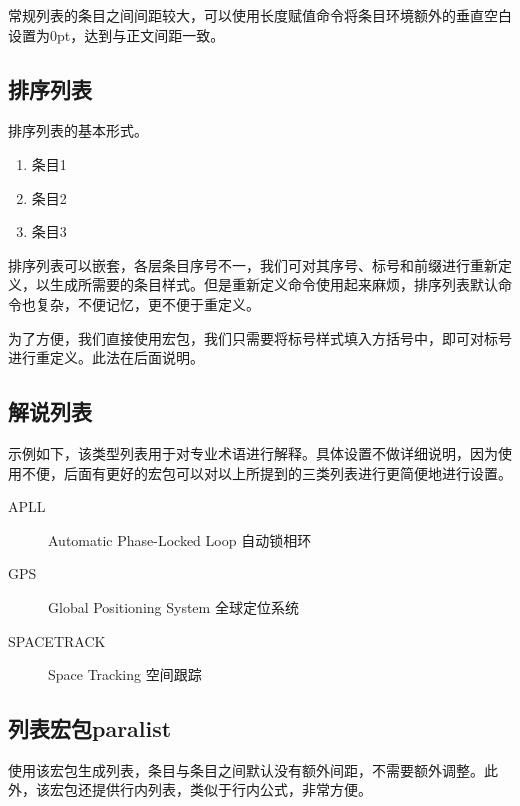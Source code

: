 常规列表的条目之间间距较大，可以使用长度赋值命令将条目环境额外的垂直空白设置为0pt，达到与正文间距一致。

\begin{latex}{}
\itemsep=0pt
\parskip=0pt
\end{latex}

\subsection{排序列表}
排序列表的基本形式。

\begin{codeshow}
	\begin{enumerate}
		\item 条目1
		\item 条目2
		\item 条目3
	\end{enumerate}
\end{codeshow}

排序列表可以嵌套，各层条目序号不一，我们可对其序号、标号和前缀进行重新定义，以生成所需要的条目样式。但是重新定义命令使用起来麻烦，排序列表默认命令也复杂，不便记忆，更不便于重定义。

为了方便，我们直接使用宏包，我们只需要将标号样式填入方括号中，即可对标号进行重定义。此法在后面说明。

\subsection{解说列表}
示例如下，该类型列表用于对专业术语进行解释。具体设置不做详细说明，因为使用不便，后面有更好的宏包可以对以上所提到的三类列表进行更简便地进行设置。

\begin{codeshow}
	\begin{description}
		\item[APLL] 
		Automatic Phase-Locked Loop 自动锁相环
		\item[GPS] Global 
		Positioning System 全球定位系统
		\item[SPACETRACK] 
		Space Tracking 空间跟踪
	\end{description}
\end{codeshow}

\subsection{列表宏包paralist}
使用该宏包生成列表，条目与条目之间默认没有额外间距，不需要额外调整。此外，该宏包还提供行内列表，类似于行内公式，非常方便。

